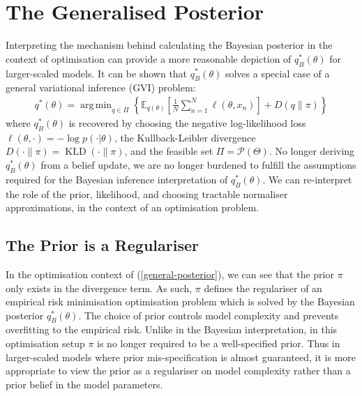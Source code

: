 \documentclass[twoside,11pt]{article}
\newcommand{\KLD}{\operatorname{KLD}}
\DeclareMathOperator*{\argmin}{arg\,min}
\begin{document}
\section{The Generalised Posterior \cite{knoblauch2022optimization}}
Interpreting the mechanism behind calculating the Bayesian posterior in the context of optimisation can provide a more reasonable depiction of $q_B^*(\theta)$ for larger-scaled models. It can be shown that $q_B^*(\theta)$ solves a special case of a general variational inference (GVI) problem:
\begin{align}
q^*(\theta) = \argmin_{q \in \Pi} \left\{ \mathbb{E}_{q(\theta)}\left[\frac{1}{N}\sum_{n=1}^N \ell(\theta, x_n)\right] + D(q\|\pi)\right\}
\label{general-posterior}
\end{align}
where $q_B^*(\theta)$ is recovered by choosing the negative log-likelihood loss $\ell(\theta, \cdot) = -\log p(\cdot | \theta)$, the Kullback-Leibler divergence $D(\cdot \| \pi) = \KLD(\cdot \| \pi)$, and the feasible set $\Pi = \mathcal{P}(\Theta)$. No longer deriving $q_B^*(\theta)$ from a belief update, we are no longer burdened to fulfill the assumptions required for the Bayesian inference interpretation of $q_B^*(\theta)$. We can re-interpret the role of the prior, likelihood, and choosing tractable normaliser approximations, in the context of an optimisation problem.

\subsection{The Prior is a Regulariser}
In the optimisation context of (\ref{general-posterior}), we can see that the prior $\pi$ only exists in the divergence term. As such, $\pi$ defines the regulariser of an empirical risk minimisation optimisation problem which is solved by the Bayesian posterior $q_B^*(\theta)$. The choice of prior controls model complexity and prevents overfitting to the empirical risk. Unlike in the Bayesian interpretation, in this optimisation setup $\pi$ is no longer required to be a well-specified prior. Thus in larger-scaled models where prior mis-specification is almost guaranteed, it is more appropriate to view the prior as a regulariser on model complexity rather than a prior belief in the model parameters.
\end{document}
